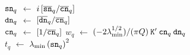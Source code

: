 \begin{algorithm2e}[t!]
{      ${\tt sn}_q$ $\gets$ $i \left[ \overline{\tt{sn}}_q / \overline{\tt{cn}}_q \right]$
      \\
      ${\tt dn}_q$ $\gets$ $\left[ \overline{\tt{dn}}_q / \overline{\tt{cn}}_q \right]$
      \\
      ${\tt cn}_q$ $\gets$ $\left[ 1 / \overline{\tt{cn}}_q \right]$
      \BlankLine
      $w_q$ $\gets$ $(-2 \lambda_\text{min}^{1/2})/(\pi Q) \: {\tt K}' \: {\tt cn}_q \: {\tt dn}_q$
      \\
      $t_q$ $\gets$ $\lambda_\text{min} \left( {\tt sn}_q \right)^2$
    }
\end{algorithm2e}
